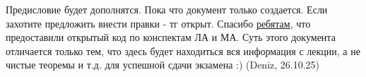 Предисловие будет дополнятся.
Пока что документ только создается. Если захотите предложить внести правки - тг открыт.
Спасибо \href{https://github.com/isagila/tesc}{ребятам}, что предоставили открытый код по конспектам ЛА и МА.
Суть этого документа отличается только тем, что здесь будет находиться вся информация с лекции,
а не чистые теоремы и т.д. для успешной сдачи экзамена :)
(Deniz, 26.10.25)

